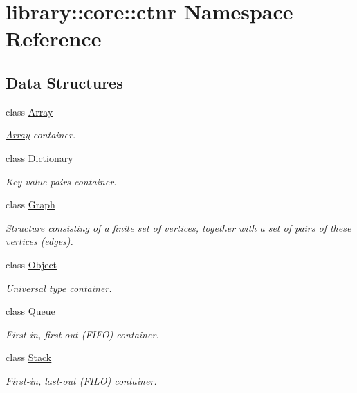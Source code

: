 \hypertarget{namespacelibrary_1_1core_1_1ctnr}{}\section{library\+:\+:core\+:\+:ctnr Namespace Reference}
\label{namespacelibrary_1_1core_1_1ctnr}
\subsection*{Data Structures}
\begin{DoxyCompactItemize}
\item 
class \hyperlink{classlibrary_1_1core_1_1ctnr_1_1Array}{Array}
\begin{DoxyCompactList}\small\item\em \hyperlink{classlibrary_1_1core_1_1ctnr_1_1Array}{Array} container. \end{DoxyCompactList}\item 
class \hyperlink{classlibrary_1_1core_1_1ctnr_1_1Dictionary}{Dictionary}
\begin{DoxyCompactList}\small\item\em Key-\/value pairs container. \end{DoxyCompactList}\item 
class \hyperlink{classlibrary_1_1core_1_1ctnr_1_1Graph}{Graph}
\begin{DoxyCompactList}\small\item\em Structure consisting of a finite set of vertices, together with a set of pairs of these vertices (edges). \end{DoxyCompactList}\item 
class \hyperlink{classlibrary_1_1core_1_1ctnr_1_1Object}{Object}
\begin{DoxyCompactList}\small\item\em Universal type container. \end{DoxyCompactList}\item 
class \hyperlink{classlibrary_1_1core_1_1ctnr_1_1Queue}{Queue}
\begin{DoxyCompactList}\small\item\em First-\/in, first-\/out (F\+I\+FO) container. \end{DoxyCompactList}\item 
class \hyperlink{classlibrary_1_1core_1_1ctnr_1_1Stack}{Stack}
\begin{DoxyCompactList}\small\item\em First-\/in, last-\/out (F\+I\+LO) container. \end{DoxyCompactList}\item 

\end{DoxyCompactItemize}
